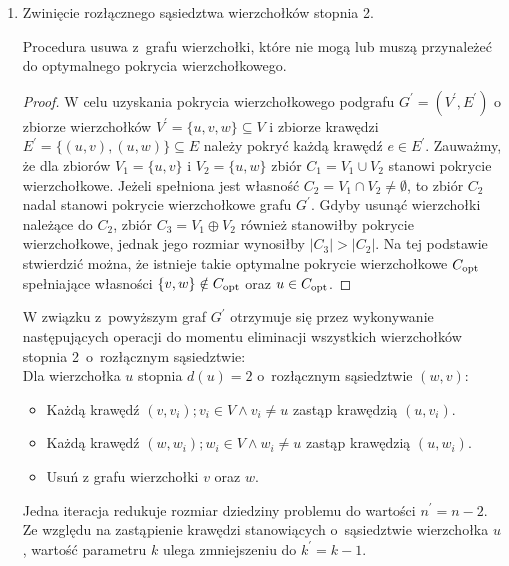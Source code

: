 \begin{enumerate}
  \item Zwinięcie rozłącznego sąsiedztwa wierzchołków stopnia 2.
    \begin{theorem}
      Procedura usuwa z~grafu wierzchołki, które nie mogą lub muszą przynależeć do 
      optymalnego pokrycia wierzchołkowego.
    \end{theorem}
    \begin{proof}
      W celu uzyskania pokrycia wierzchołkowego podgrafu $G^\prime=(V^\prime,E^\prime)$ o zbiorze wierzchołków $V^\prime=\{u, v, w\} \subseteq V$ i zbiorze krawędzi $E^\prime=\{(u,v), (u,w)\} \subseteq E$ należy pokryć każdą krawędź $e \in E^\prime$. 
      Zauważmy, że dla zbiorów $V_1=\{u,v\}$ i $V_2=\{u,w\}$ zbiór $C_1=V_1 \cup V_2$ stanowi pokrycie wierzchołkowe.
      Jeżeli spełniona jest własność $C_2=V_1 \cap V_2 \neq \emptyset$, to zbiór $C_2$ nadal stanowi pokrycie wierzchołkowe grafu $G^\prime$.
      Gdyby usunąć wierzchołki należące do $C_2$, zbiór $C_3=V_1 \oplus V_2$ również stanowiłby pokrycie wierzchołkowe, jednak jego rozmiar wynosiłby $|C_3| > |C_2|$.
      Na tej podstawie stwierdzić można, że istnieje takie optymalne pokrycie wierzchołkowe $C_{\textnormal{opt}}$ spełniające własności $\{v,w\} \notin C_{\textnormal{opt}}$ oraz $u \in C_{\textnormal{opt}}$.
    \end{proof}

    W związku z~powyższym graf $G^\prime$ otrzymuje się przez wykonywanie następujących operacji do momentu eliminacji wszystkich wierzchołków stopnia 2\ o~rozłącznym 
    sąsiedztwie:\\
    Dla wierzchołka $u$ stopnia $d(u)=2$ o~rozłącznym sąsiedztwie $(w,v)$:
    \begin{itemize}
      \item Każdą krawędź $(v,v_i); v_i \in V \land v_i \neq u$ zastąp 
        krawędzią $(u, v_i)$.
      \item Każdą krawędź $(w,w_i); w_i \in V \land w_i \neq u$ zastąp
        krawędzią $(u, w_i)$.
      \item Usuń z grafu wierzchołki $v$ oraz $w$.
    \end{itemize}
    Jedna iteracja redukuje rozmiar dziedziny problemu do wartości
    $n^\prime=n-2$.
    Ze względu na zastąpienie krawędzi stanowiących o~sąsiedztwie wierzchołka $u$, wartość parametru $k$ ulega zmniejszeniu do $k^\prime=k-1$.
\end{enumerate}